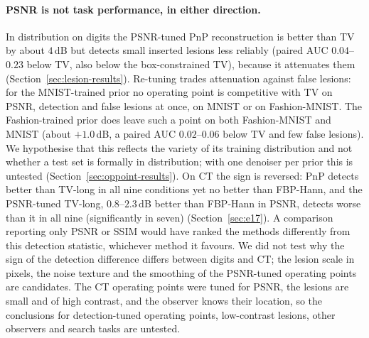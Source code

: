 \paragraph{PSNR is not task performance, in either direction.}
In distribution on digits the PSNR-tuned PnP reconstruction is better than TV by about $4$\,dB but detects small inserted lesions less reliably (paired AUC $0.04$--$0.23$ below TV, also below the box-constrained TV), because it attenuates them (Section~\ref{sec:lesion-results}). Re-tuning trades attenuation against false lesions: for the MNIST-trained prior no operating point is competitive with TV on PSNR, detection and false lesions at once, on MNIST or on Fashion-MNIST. The Fashion-trained prior does leave such a point on both Fashion-MNIST and MNIST (about $+1.0$\,dB, a paired AUC $0.02$--$0.06$ below TV and few false lesions). We hypothesise that this reflects the variety of its training distribution and not whether a test set is formally in distribution; with one denoiser per prior this is untested (Section~\ref{sec:oppoint-results}).
On CT the sign is reversed: PnP detects better than TV-long in all nine conditions yet no better than FBP-Hann, and the PSNR-tuned TV-long, $0.8$--$2.3$\,dB better than FBP-Hann in PSNR, detects worse than it in all nine (significantly in seven) (Section~\ref{sec:e17}). A comparison reporting only PSNR or SSIM would have ranked the methods differently from this detection statistic, whichever method it favours.
We did not test why the sign of the detection difference differs between digits and CT; the lesion scale in pixels, the noise texture and the smoothing of the PSNR-tuned operating points are candidates. The CT operating points were tuned for PSNR, the lesions are small and of high contrast, and the observer knows their location, so the conclusions for detection-tuned operating points, low-contrast lesions, other observers and search tasks are untested.

